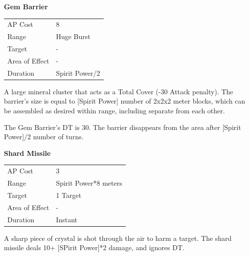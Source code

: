 \documentclass[11pt,a4paper,twocolumn]{book}
\begin{document}
\noindent
\textbf{Gem Barrier}

\smallskip
{
	\begin{tabu} to 70mm{| X[l,4] | X[l,7] |}
		\hline
        AP Cost	      	& 8 					\\
        Range     		& Huge Burst			\\
        Target      	& -						\\
        Area of Effect  & -  	 				\\
        Duration     	& Spirit Power/2		\\ \hline
	\end{tabu}
		
}

\medskip

A large mineral cluster that acts as a Total Cover (-30 Attack penalty). The barrier's size is equal to [Spirit Power] number of 2x2x2 meter blocks, which can be assembled as desired within range, including separate from each other. 

The Gem Barrier's DT is 30. The barrier disappears from the area after [Spirit Power]/2 number of turns.

\bigskip
\noindent
\textbf{Shard Missile}

\smallskip
{
	\begin{tabu} to 70mm{| X[l,4] | X[l,7] |}
		\hline
        AP Cost	      	& 3 					\\
        Range     		& Spirit Power*8 meters	\\
        Target      	& 1 Target				\\
        Area of Effect  & -  	 				\\
        Duration     	& Instant				\\ \hline
	\end{tabu}
		
}

\medskip

A sharp piece of crystal is shot through the air to harm a target. The shard missile deals 10+ [SPirit Power]*2 damage, and ignores DT. 

\vfill
\end{document}
